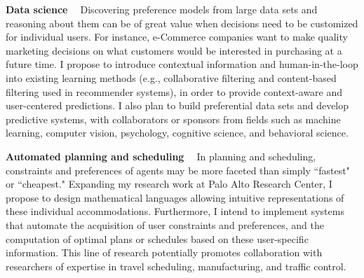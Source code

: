\documentclass[11pt]{article}
\begin{document}
\smallskip \noindent \textbf{Data science \  } Discovering preference 
models from large data sets and reasoning about them 
can be of great value when decisions need to be customized for individual users.
For instance, e-Commerce companies want to make quality marketing decisions
on what customers would be interested in purchasing at a future time.
I propose to introduce contextual information and human-in-the-loop into existing learning methods
(e.g., collaborative filtering and content-based filtering used in recommender systems), 
in order to provide context-aware and user-centered predictions.
I also plan to build preferential data sets and develop predictive systems, with collaborators
or sponsors from fields 
such as machine learning, computer vision, psychology, cognitive science, and behavioral science.

\smallskip \noindent \textbf{Automated planning and scheduling \  }
In planning and scheduling, constraints and preferences of agents may be more faceted than simply
``fastest" or ``cheapest."
Expanding my research work at Palo Alto Research Center,
I propose to design mathematical languages allowing
intuitive representations of these individual accommodations. 
Furthermore, I intend to implement systems
that automate the acquisition of user constraints and preferences, and the computation of optimal plans or schedules 
based on these user-specific information.
This line of research potentially promotes collaboration with researchers of expertise in
travel scheduling, manufacturing, and traffic control.


{}
\end{document}
